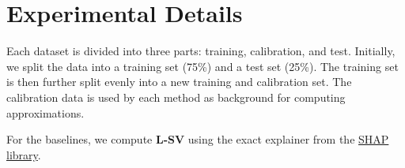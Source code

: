 \documentclass{article}
\theoremstyle{plain}
\theoremstyle{definition}
\theoremstyle{remark}
\newcommand{\ours}{\textcolor{ours}{\textbf{R-LOCO}}}
\newcommand{\lsv}{\textcolor{lsv}{\textbf{L-SV}}}
\begin{document}

\newpage
\section{Experimental Details}\label{sup:exp_details}

Each dataset is divided into three parts: training, calibration, and test. Initially, we split the data into a training set (75\%) and a test set (25\%). The training set is then further split evenly into a new training and calibration set. The calibration data is used by each method as background for computing approximations.

For the baselines, we compute \lsv{} using the exact explainer from the \href{https://github.com/shap/shap}{SHAP library}.
\end{document}
